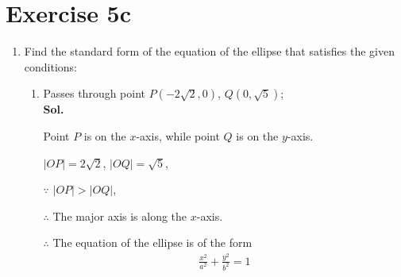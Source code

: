 \documentclass{report}
\newcommand{\sol}{\vspace{1em}\\\textbf{Sol.}}
\begin{document}
\section*{Exercise 5c}

\onehalfspacing
\begin{enumerate}[leftmargin=*]
    \item Find the standard form of the equation of the ellipse that satisfies the given
          conditions:
          \begin{enumerate}
              \item Passes through point $P(-2\sqrt{2}, 0)$, $Q(0, \sqrt{5})$; \sol{}

                    Point $P$ is on the $x$-axis, while point $Q$ is on the $y$-axis.

                    $|OP| = 2\sqrt{2}$, $|OQ| = \sqrt{5}$,

                    $\because$ $|OP| > |OQ|$,

                    $\therefore$ The major axis is along the $x$-axis.

                    $\therefore$ The equation of the ellipse is of the form
                    \begin{align*}
                        \frac{x^2}{a^2} + \frac{y^2}{b^2} = 1
                    \end{align*}


\end{enumerate}
\end{enumerate}
\end{document}

